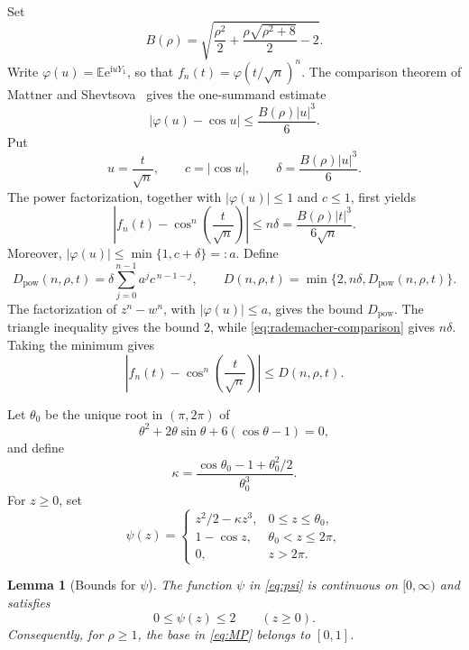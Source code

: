 \documentclass[11pt,a4paper,twoside]{article}
\newcommand{\manualtag}[1]{\tag{#1}}
\newtheorem{lemma}[theorem]{Lemma}
\theoremstyle{remark}
\newcommand{\E}{\mathbb{E}}
\newcommand{\iu}{\mathrm{i}}
\newcommand{\e}{\mathrm{e}}
\newcommand{\abs}[1]{\lvert#1\rvert}
\begin{document}
Set
\begin{equation}
 B(\rho)=
 \sqrt{\frac{\rho^2}{2}
       +\frac{\rho\sqrt{\rho^2+8}}{2}-2}.
 \manualtag{8}\label{eq:B}
\end{equation}
Write \(\varphi(u)=\E\e^{\iu uY_1}\), so that
\(f_n(t)=\varphi(t/\sqrt n)^n\).  The comparison theorem of Mattner and
Shevtsova~\cite{MattnerShevtsova2019} gives the one-summand estimate
\[
 \abs{\varphi(u)-\cos u}
 \le \frac{B(\rho)\abs u^3}{6}.
\]
Put
\[
 u=\frac{t}{\sqrt n},
 \qquad
 c=\abs{\cos u},
 \qquad
 \delta=\frac{B(\rho)\abs u^3}{6}.
\]
The power factorization, together with
\(\abs{\varphi(u)}\le1\) and \(c\le1\), first yields
\begin{equation}
 \left|
 f_n(t)-\cos^n\!\left(\frac{t}{\sqrt n}\right)
 \right|
 \le
 n\delta
 =\frac{B(\rho)\abs t^3}{6\sqrt n}.
 \manualtag{9}\label{eq:rademacher-comparison}
\end{equation}
Moreover,
\(\abs{\varphi(u)}\le\min\{1,c+\delta\}=:a\).  Define
\[
 D_{\mathrm{pow}}(n,\rho,t)
 =
 \delta\sum_{j=0}^{n-1}a^jc^{\,n-1-j},
 \qquad
 D(n,\rho,t)
 =
 \min\{2,n\delta,D_{\mathrm{pow}}(n,\rho,t)\}.
\]
The factorization of \(z^n-w^n\), with
\(\abs{\varphi(u)}\le a\), gives the bound \(D_{\mathrm{pow}}\).
The triangle inequality gives the bound \(2\), while
\eqref{eq:rademacher-comparison} gives \(n\delta\).  Taking the minimum gives
\begin{equation}
 \left|
 f_n(t)-\cos^n\!\left(\frac{t}{\sqrt n}\right)
 \right|
 \le D(n,\rho,t).
 \manualtag{10}\label{eq:power-bound}
\end{equation}

Let \(\theta_0\) be the unique root in \((\pi,2\pi)\) of
\[
 \theta^2+2\theta\sin\theta+6(\cos\theta-1)=0,
\]
and define
\[
 \kappa=
 \frac{\cos\theta_0-1+\theta_0^2/2}{\theta_0^3}.
\]
For \(z\ge0\), set
\begin{equation}
 \psi(z)=
 \begin{cases}
  z^2/2-\kappa z^3, & 0\le z\le\theta_0,\\
  1-\cos z,         & \theta_0<z\le2\pi,\\
  0,                & z>2\pi.
 \end{cases}
 \manualtag{11}\label{eq:psi}
\end{equation}

\begin{lemma}[Bounds for \(\psi\)]\label{lem:psi-bounds}
The function \(\psi\) in \eqref{eq:psi} is continuous on
\([0,\infty)\) and satisfies
\[
 0\le\psi(z)\le2
 \qquad(z\ge0).
\]
Consequently, for \(\rho\ge1\), the base in \eqref{eq:MP} belongs
to \([0,1]\).
\end{lemma}
\end{document}
